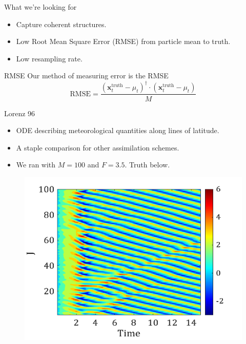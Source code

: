 \documentclass[aspectratio=169]{beamer}
\newcommand{\state}{\boldsymbol{x}}
\begin{document}

\begin{frame}{What we're looking for}
\vfill
    \begin{itemize}
        \item Capture coherent structures.
        \item Low Root Mean Square Error (RMSE) from particle mean to truth.
        \item Low resampling rate.
    \end{itemize}
\vfill
\end{frame}


\begin{frame}{RMSE}
\vfill
Our method of measuring error is the RMSE
\[
\textrm{RMSE} = \frac{(\state_t^{\textrm{truth}}-\mu_t)^\dagger \cdot (\state_t^{\textrm{truth}}-\mu_t)}{M}
\]
\vfill
\end{frame}




\begin{frame}{Lorenz 96}
\begin{itemize}
    \item ODE describing meteorological quantities along lines of latitude.
    \item A staple comparison for other assimilation schemes.
    \item We ran with $M=100$ and $F=3.5$. Truth below. 
\end{itemize}
\begin{figure}[H]
    \centering
    \includegraphics[width=.5\textwidth]{figures/L96_F3.5N100.png}
\end{figure}
\end{frame}
\end{document}
